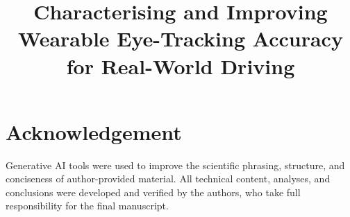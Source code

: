 \documentclass[conference]{IEEEtran}
\begin{document}
\title{Characterising and Improving Wearable Eye-Tracking Accuracy\\
for Real-World Driving}


\author{
}

\maketitle

\begin{abstract}

\end{abstract}









\section*{Acknowledgement}
Generative AI tools were used to improve the scientific phrasing, structure,
and conciseness of author-provided material. All technical content, analyses,
and conclusions were developed and verified by the authors, who take full
responsibility for the final manuscript.



\end{document}
